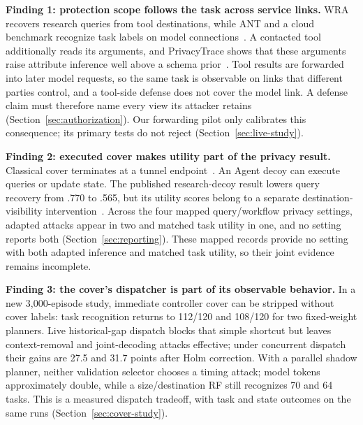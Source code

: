 \textbf{Finding 1: protection scope follows the task across service links.} WRA recovers research queries from tool destinations, while ANT and a cloud benchmark recognize task labels on model connections~\cite{jeong2026wra,li2026ant,pouryousef2026traffic}. A contacted tool additionally reads its arguments, and PrivacyTrace shows that these arguments raise attribute inference well above a schema prior~\cite{duan2026privacytrace}. Tool results are forwarded into later model requests, so the same task is observable on links that different parties control, and a tool-side defense does not cover the model link. A defense claim must therefore name every view its attacker retains (Section~\ref{sec:authorization}). Our forwarding pilot only calibrates this consequence; its primary tests do not reject (Section~\ref{sec:live-study}).

\textbf{Finding 2: executed cover makes utility part of the privacy result.} Classical cover terminates at a tunnel endpoint~\cite{apthorpe2019stp}. An Agent decoy can execute queries or update state. The published research-decoy result lowers query recovery from .770 to .565, but its utility scores belong to a separate destination-visibility intervention~\cite{jeong2026wra}. Across the four mapped query/workflow privacy settings, adapted attacks appear in two and matched task utility in one, and no setting reports both (Section~\ref{sec:reporting}). These mapped records provide no setting with both adapted inference and matched task utility, so their joint evidence remains incomplete.

\textbf{Finding 3: the cover's dispatcher is part of its observable behavior.} In a new 3,000-episode study, immediate controller cover can be stripped without cover labels: task recognition returns to 112/120 and 108/120 for two fixed-weight planners. Live historical-gap dispatch blocks that simple shortcut but leaves context-removal and joint-decoding attacks effective; under concurrent dispatch their gains are 27.5 and 31.7 points after Holm correction. With a parallel shadow planner, neither validation selector chooses a timing attack; model tokens approximately double, while a size/destination RF still recognizes 70 and 64 tasks. This is a measured dispatch tradeoff, with task and state outcomes on the same runs (Section~\ref{sec:cover-study}).

